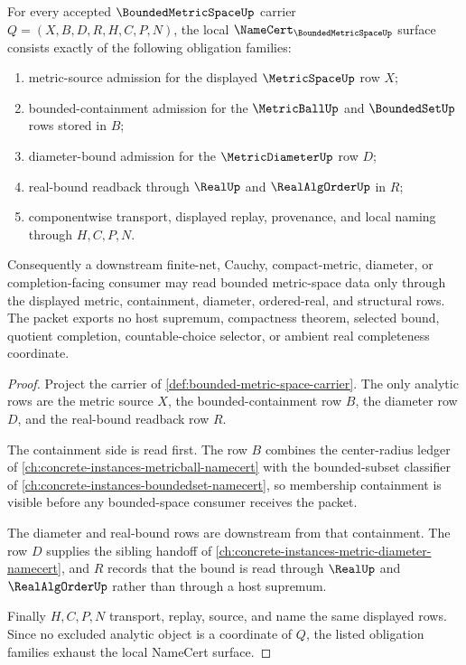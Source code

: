 \begin{theorem}
\label{thm:bounded-metric-space-namecert-obligations}
For every accepted $\BoundedMetricSpaceUp$ carrier $Q=(X,B,D,R,H,C,P,N)$, the local $\NameCert_{\BoundedMetricSpaceUp}$ surface consists exactly of the following obligation families:
\begin{enumerate}
\item metric-source admission for the displayed $\MetricSpaceUp$ row $X$;
\item bounded-containment admission for the $\MetricBallUp$ and $\BoundedSetUp$ rows stored in $B$;
\item diameter-bound admission for the $\MetricDiameterUp$ row $D$;
\item real-bound readback through $\RealUp$ and $\RealAlgOrderUp$ in $R$;
\item componentwise transport, displayed replay, provenance, and local naming through $H,C,P,N$.
\end{enumerate}
Consequently a downstream finite-net, Cauchy, compact-metric, diameter, or completion-facing consumer may read bounded metric-space data only through the displayed metric, containment, diameter, ordered-real, and structural rows. The packet exports no host supremum, compactness theorem, selected bound, quotient completion, countable-choice selector, or ambient real completeness coordinate.
\end{theorem}
\begin{proof}
Project the carrier of \autoref{def:bounded-metric-space-carrier}. The only analytic rows are the metric source $X$, the bounded-containment row $B$, the diameter row $D$, and the real-bound readback row $R$.

The containment side is read first. The row $B$ combines the center-radius ledger of \autoref{ch:concrete-instances-metricball-namecert} with the bounded-subset classifier of \autoref{ch:concrete-instances-boundedset-namecert}, so membership containment is visible before any bounded-space consumer receives the packet.

The diameter and real-bound rows are downstream from that containment. The row $D$ supplies the sibling handoff of \autoref{ch:concrete-instances-metric-diameter-namecert}, and $R$ records that the bound is read through $\RealUp$ and $\RealAlgOrderUp$ rather than through a host supremum.

Finally $H,C,P,N$ transport, replay, source, and name the same displayed rows. Since no excluded analytic object is a coordinate of $Q$, the listed obligation families exhaust the local NameCert surface.
\end{proof}

